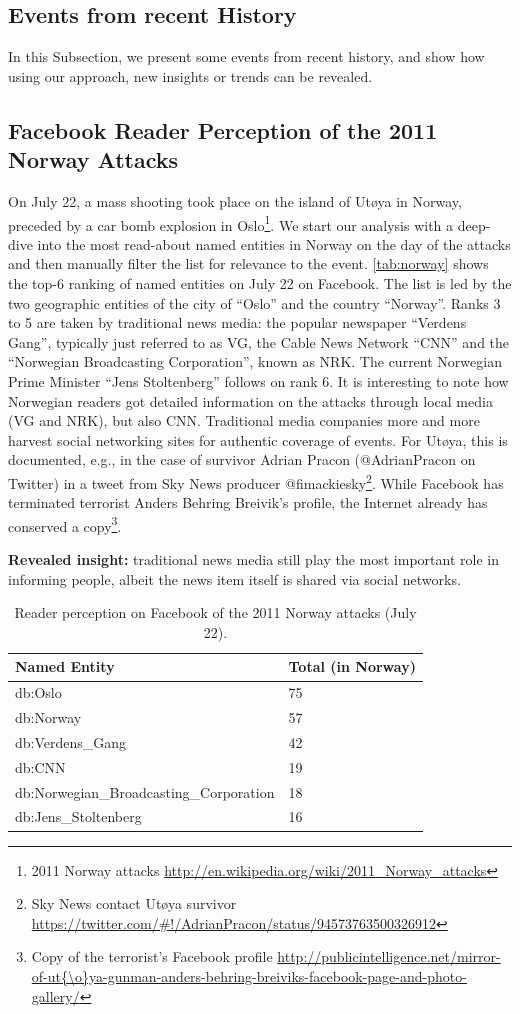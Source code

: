 \documentclass{iosart2c}
\begin{document}
\subsection{Events from recent History}
In this Subsection, we present some events from recent history, and show how using our approach, new insights or trends can be revealed.

\subsection{Facebook Reader Perception of the 2011 Norway Attacks}
On July 22, a mass shooting took place on the island of Utøya in Norway, preceded by a car bomb explosion in Oslo\footnote{2011 Norway attacks \url{http://en.wikipedia.org/wiki/2011_Norway_attacks}}.
We start our analysis with a deep-dive into the most read-about named entities in Norway on the day of the attacks and then manually filter the list for relevance to the event.
\autoref{tab:norway} shows the top-6 ranking of named entities on July 22 on Facebook.
The list is led by the two geographic entities of the city of ``Oslo'' and the country ``Norway''.
Ranks 3 to 5 are taken by traditional news media: the popular newspaper ``Verdens Gang'', typically just referred to as VG, the Cable News Network ``CNN'' and the ``Norwegian Broadcasting Corporation'', known as NRK.
The current Norwegian Prime Minister ``Jens Stoltenberg'' follows on rank 6.
It is interesting to note how Norwegian readers got detailed information on the attacks through local media (VG and NRK), but also CNN.
Traditional media companies more and more harvest social networking sites for authentic coverage of events.
For Utøya, this is documented, e.g., in the case of survivor Adrian Pracon (@AdrianPracon on Twitter) in a tweet from Sky News producer @fimackiesky\footnote{Sky News contact Utøya survivor \url{https://twitter.com/\#!/AdrianPracon/status/94573763500326912}}.
While Facebook has terminated terrorist Anders Behring Breivik's profile, the Internet already has conserved a copy\footnote{Copy of the terrorist's Facebook profile \url{http://publicintelligence.net/mirror-of-ut{\o}ya-gunman-anders-behring-breiviks-facebook-page-and-photo-gallery/}}. 

\textbf{Revealed insight:}
traditional news media still play the most important role in informing people, albeit the news item itself is shared via social networks. 

\begin{table}
    \begin{tabular}{ | l | l |}
    \hline
	\textbf{Named Entity} & \textbf{Total (in Norway)}\\ \hline
	db:Oslo & 75\\
	db:Norway & 57\\
	db:Verdens\_Gang & 42\\
	db:CNN & 19\\
	db:Norwegian\_Broadcasting\_Corporation & 18\\
	db:Jens\_Stoltenberg & 16\\
    \hline
  \end{tabular}
  \caption{Reader perception on Facebook of the 2011 Norway attacks (July 22).}
  \label{tab:norway}  
\end{table}
\end{document}
